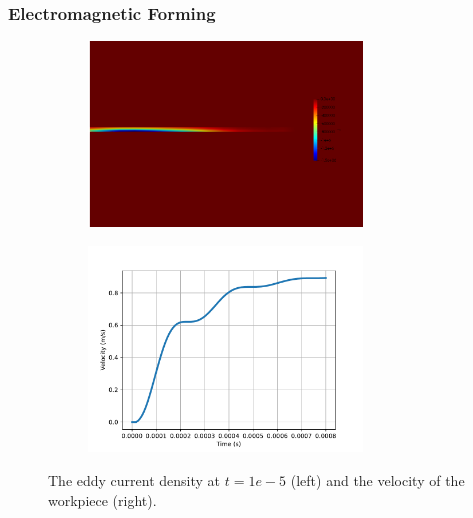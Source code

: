 \documentclass[notheorems,serif]{beamer}
\begin{document}
\begin{CJK}{UTF8}{gkai}
\begin{frame}
  \frametitle{Electromagnetic Forming}
  \begin{figure}[htpb]
    \centering
    \begin{subfigure}[t]{0.49\linewidth}
        \centering
        \includegraphics[width=0.8\textwidth]{../figures/movingmaxwell/J10.png}
    \end{subfigure}
    \begin{subfigure}[t]{0.49\linewidth}
        \centering
        \includegraphics[width=0.8\textwidth]{../figures/movingmaxwell/v_plot.pdf}
    \end{subfigure}
    \caption{The eddy current density at $t=1e-5$ (left) and the velocity of the 
    workpiece (right).}
\end{figure}
\end{frame}




\end{CJK}
\end{document}
